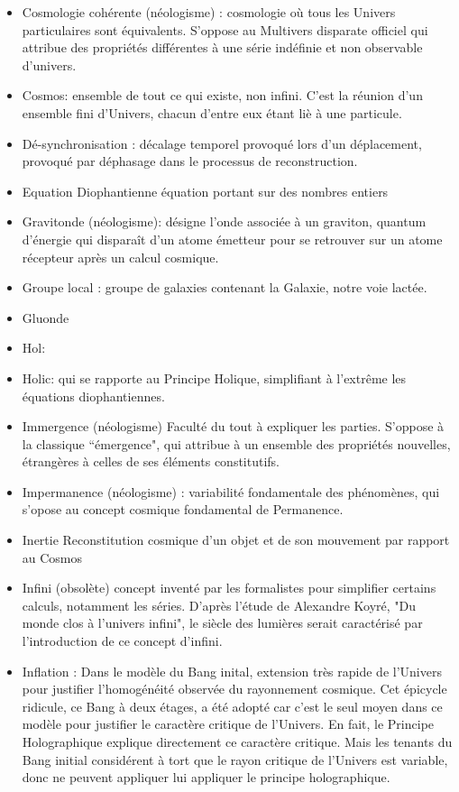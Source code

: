 \documentclass[a4paper,12pt]{article}
\begin{document}
\begin{appendix}
\begin{itemize}
\item Cosmologie cohérente (néologisme) : cosmologie où tous les Univers particulaires sont équivalents. S’oppose au Multivers disparate officiel qui attribue des propriétés différentes à une série indéfinie et non observable d’univers.

\item Cosmos: ensemble de tout ce qui existe, non infini. C'est la réunion d'un ensemble fini d'Univers, chacun d'entre eux étant liè à une particule.


\item Dé-synchronisation : décalage temporel provoqué lors d’un déplacement, provoqué par déphasage dans le processus de reconstruction.
\item Equation Diophantienne équation portant sur des nombres entiers
\item Gravitonde (néologisme): désigne l’onde associée à un graviton, quantum d’énergie qui disparaît d’un atome émetteur pour se retrouver sur un atome récepteur après un calcul cosmique.
\item Groupe local : groupe de galaxies contenant la Galaxie, notre voie lactée.
\item Gluonde
\item Hol: 
\item Holic: qui se rapporte au Principe Holique, simplifiant à l'extr\^eme les équations diophantiennes.
\item Immergence (néologisme) Faculté du tout à expliquer les parties. S’oppose à la classique ``émergence", qui attribue à un ensemble des propriétés nouvelles, étrangères à celles de ses éléments constitutifs.

\item Impermanence (néologisme) : variabilité fondamentale des phénomènes, qui s'opose au concept cosmique fondamental de Permanence.



\item Inertie Reconstitution cosmique d’un objet et de son mouvement par rapport au Cosmos
\item Infini (obsolète) concept inventé par les formalistes pour simplifier certains calculs, notamment les séries. D'après l'étude de Alexandre Koyré, "Du monde clos à l'univers infini", le siècle des lumières serait caractérisé par l'introduction de ce concept d'infini.

\item Inflation : Dans le modèle du Bang inital, extension très rapide de l'Univers pour justifier l'homogénéité observée du rayonnement cosmique.  Cet épicycle ridicule, ce Bang à deux étages, a été adopté car c'est le seul moyen dans ce modèle pour justifier le caractère critique de l'Univers. En fait, le Principe Holographique explique directement ce caractère critique. Mais les tenants du Bang initial considérent à tort que le rayon critique de l'Univers est variable, donc ne peuvent appliquer lui appliquer le principe holographique.




\end{itemize}
\end{appendix}
\end{document}
